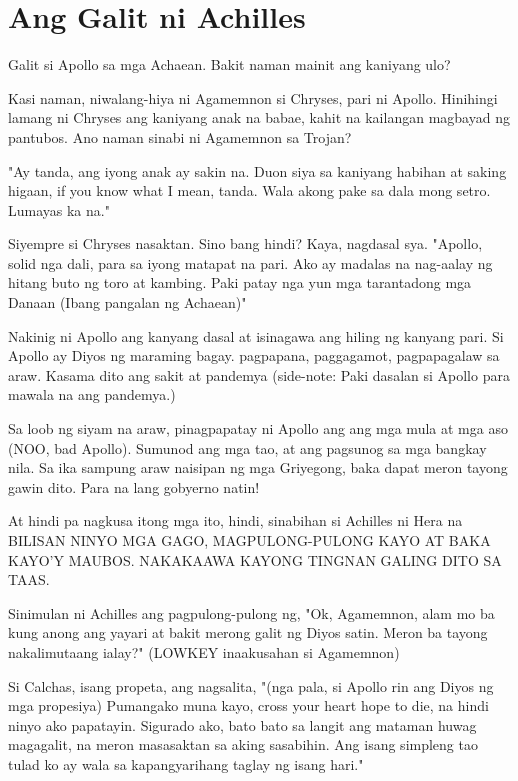 \documentclass[12pt,letterpaper]{report}
\begin{document}
\chapter{Ang Galit ni Achilles}

Galit si Apollo sa mga Achaean. Bakit naman mainit ang kaniyang ulo?


Kasi naman, niwalang-hiya ni Agamemnon si Chryses, pari ni Apollo. Hinihingi lamang ni Chryses ang kaniyang anak na babae,
kahit na kailangan magbayad ng pantubos. Ano naman sinabi ni Agamemnon sa Trojan?

"Ay tanda, ang iyong anak ay sakin na. Duon siya sa kaniyang habihan at saking higaan,
if you know what I mean, tanda. Wala akong pake sa dala mong setro. Lumayas ka na."

Siyempre si Chryses nasaktan. Sino bang hindi? Kaya, nagdasal sya.
"Apollo, solid nga dali, para sa iyong matapat na pari. Ako ay madalas na nag-aalay ng hitang buto ng toro at kambing.
Paki patay nga yun mga tarantadong mga Danaan (Ibang pangalan ng Achaean)"

Nakinig ni Apollo ang kanyang dasal at isinagawa ang hiling ng kanyang pari.
Si Apollo ay Diyos ng maraming bagay. pagpapana, paggagamot, pagpapagalaw sa araw.
Kasama dito ang sakit at pandemya (side-note: Paki dasalan si Apollo para mawala na ang pandemya.)

Sa loob ng siyam na araw, pinagpapatay ni Apollo ang ang mga mula at mga aso (NOO, bad Apollo).
Sumunod ang mga tao, at ang pagsunog sa mga bangkay nila. Sa ika sampung araw naisipan ng mga Griyegong,
baka dapat meron tayong gawin dito. Para na lang gobyerno natin!

At hindi pa nagkusa itong mga ito, hindi, sinabihan si Achilles ni Hera na BILISAN NINYO MGA GAGO,
MAGPULONG-PULONG KAYO AT BAKA KAYO'Y MAUBOS. NAKAKAAWA KAYONG TINGNAN GALING DITO SA TAAS.

Sinimulan ni Achilles ang pagpulong-pulong ng, "Ok, Agamemnon, alam mo ba kung anong ang yayari at bakit merong galit ng Diyos satin.
Meron ba tayong nakalimutaang ialay?" (LOWKEY inaakusahan si Agamemnon)

Si Calchas, isang propeta, ang nagsalita,
"(nga pala, si Apollo rin ang Diyos ng mga propesiya) Pumangako muna kayo,
cross your heart hope to die, na hindi ninyo ako papatayin. Sigurado ako, bato bato sa langit ang mataman huwag magagalit,
na meron masasaktan sa aking sasabihin. Ang isang simpleng tao tulad ko ay wala sa kapangyarihang taglay ng isang hari."
\end{document}
